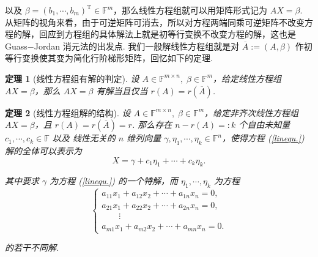 \documentclass[10pt,openany]{article}
\theoremstyle{thmstyle} %
\newtheorem{theorem}{定理}[subsection]
\theoremstyle{defstyle} %
\theoremstyle{prostyle} %
\theoremstyle{exastyle}
\theoremstyle{remstyle}
\newcommand{\T}{^{\text{T}}}
\newcommand{\F}{\mathbb{F}}
\newcommand{\mn}{^{m \times n}}
\begin{document}
以及 \( \beta=(b_1,\cdots,b_m)\T \in \F^m \)，那么线性方程组就可以用矩阵形式记为 \( AX=\beta \). 从矩阵的视角来看，由于可逆矩阵可消去，所以对方程两端同乘可逆矩阵不改变方程的解，回应到方程组的具体解法上就是初等行变换不改变方程的解，这也是 Guass\(-\)Jordan 消元法的出发点. 我们一般解线性方程组就是对 \( \overline{A}:=(A,\beta) \) 作初等行变换使其变为简化行阶梯形矩阵，回忆如下的定理.

\begin{theorem}[线性方程组有解的判定]	\label{4.3.1}
	设 \( A \in \F\mn, \; \beta \in \F^m \)，给定线性方程组 \( AX=\beta \)，那么 \( AX=\beta \) 有解当且仅当 \( r(A)=r(\overline{A}) \).
\end{theorem}

\begin{theorem}[线性方程组解的结构]	\label{4.3.2}
	设 \( A \in \F\mn, \; \beta \in \F^m \)，给定非齐次线性方程组 \( AX=\beta \)，且 \( r(A)=r(\overline{A})=r \). 那么存在 \( n-r(A)=:k \) 个自由未知量 \( c_1,\cdots,c_{k} \in \F \) 以及{\color{blue} 线性无关的} \( n \) 维列向量 \( \gamma,\eta_1,\cdots,\eta_k \in \F^n \)，使得方程 (\ref{linequ.}) 解的全体可以表示为
	\[ X=\gamma+c_1\eta_1+\cdots+c_k\eta_k. \] 
	
	其中要求 \( \gamma \) 为方程 (\ref{linequ.}) 的一个特解，而 \( \eta_1,\cdots,\eta_k \) 为方程
	\begin{equation}
		\left\{\begin{array}{l}
			a_{11}x_1+a_{12}x_2+\cdots+a_{1n}x_n=0, \\
			a_{21}x_1+a_{22}x_2+\cdots+a_{2n}x_n=0, \\
			\qquad \vdots \\
			a_{m1}x_1+a_{m2}x_2+\cdots+a_{mn}x_n=0.
		\end{array}\right.
		\label{linequ.2}
	\end{equation}
	
	的若干不同解.
\end{theorem}
\end{document}

